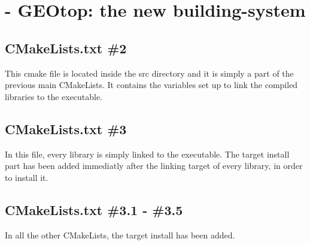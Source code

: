 \section{ - GEOtop: the new building-system}\label{sec:20150715}
\subsection{CMakeLists.txt \#2}

This cmake file is located inside the src directory and it is simply a part of the previous main CMakeLists. It contains the variables set up to link the compiled libraries to the executable.

\subsection{CMakeLists.txt \#3}

In this file, every library is simply linked to the executable. The target install part has been added immediatly after the linking target of every library, in order to install it.

\subsection{CMakeLists.txt \#3.1 - \#3.5}

In all the other CMakeLists, the target install has been added.
